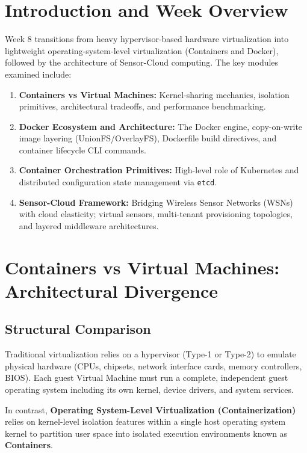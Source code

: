 \documentclass[11pt,a4paper,openany]{report}
\begin{document}
\section{Introduction and Week Overview}
Week 8 transitions from heavy hypervisor-based hardware virtualization into lightweight operating-system-level virtualization (Containers and Docker), followed by the architecture of Sensor-Cloud computing. The key modules examined include:
\begin{enumerate}[leftmargin=*]
  \item \textbf{Containers vs Virtual Machines:} Kernel-sharing mechanics, isolation primitives, architectural tradeoffs, and performance benchmarking.
  \item \textbf{Docker Ecosystem and Architecture:} The Docker engine, copy-on-write image layering (UnionFS/OverlayFS), Dockerfile build directives, and container lifecycle CLI commands.
  \item \textbf{Container Orchestration Primitives:} High-level role of Kubernetes and distributed configuration state management via \texttt{etcd}.
  \item \textbf{Sensor-Cloud Framework:} Bridging Wireless Sensor Networks (WSNs) with cloud elasticity; virtual sensors, multi-tenant provisioning topologies, and layered middleware architectures.
\end{enumerate}

\section{Containers vs Virtual Machines: Architectural Divergence}
\subsection{Structural Comparison}
Traditional virtualization relies on a hypervisor (Type-1 or Type-2) to emulate physical hardware (CPUs, chipsets, network interface cards, memory controllers, BIOS). Each guest Virtual Machine must run a complete, independent guest operating system including its own kernel, device drivers, and system services.

In contrast, \textbf{Operating System-Level Virtualization (Containerization)} relies on kernel-level isolation features within a single host operating system kernel to partition user space into isolated execution environments known as \textbf{Containers}.
\end{document}
